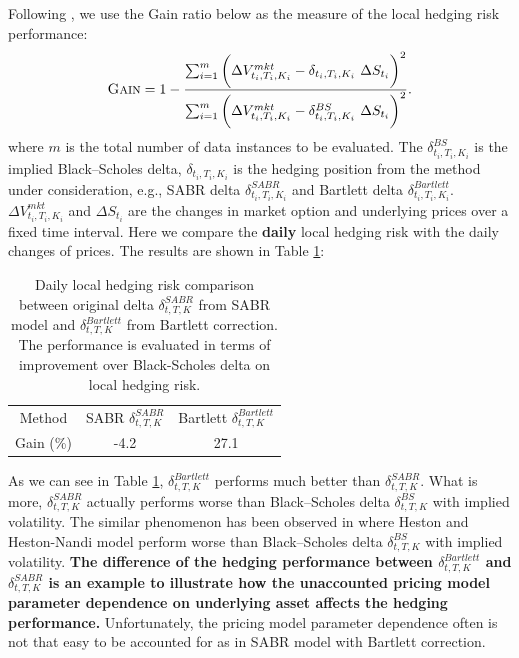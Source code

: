 \documentclass[letterpaper,12pt,titlepage,oneside,final]{book}
\numberwithin{equation}{section}
\theoremstyle{definition}
\begin{document}
\begin{itemize}
    Following \cite{hulloptimal},  we use the Gain ratio below as the measure of the local hedging risk performance:
    \begin{equation}
    \textsc{Gain}=1-\frac{\sum_{i=1}^m \bigg(\Delta V^{mkt}_{t_i,T_i,K_i}-\delta_{t_i,T_i,K_i} ~ \Delta S_{t_i} \bigg)^2}{\sum_{i=1}^m \bigg(\Delta V^{mkt}_{t_i,T_i,K_i}-\delta^{BS}_{t_i,T_i,K_i} ~ \Delta S_{t_i} \bigg)^2}.
    \label{eq:Gain}
    \end{equation}
    where $m$ is the total number of data instances to be evaluated.  The $\delta^{BS}_{t_i,T_i,K_i}$ is the implied Black–Scholes delta, $\delta_{t_i,T_i,K_i}$  is the hedging position from the method under consideration,  e.g., SABR delta $\delta^{SABR}_{t_i,T_i,K_i}$ and  Bartlett delta $\delta^{Bartlett}_{t_i,T_i,K_i}$. $\Delta V^{mkt}_{t_i,T_i,K_i}$ and $\Delta S_{t_i}$
    are the changes in market option and underlying prices over a fixed time interval. Here we compare the \textbf{daily} local hedging risk with the daily changes of prices. The results are shown in Table \ref{table:Bartlett}:
    \begin{table}[htp!]
        \centering
        \begin{tabular}{|c|c|c|}
            \hline
            Method& SABR $\delta^{SABR}_{t,T,K}$ & Bartlett $\delta^{Bartlett}_{t,T,K}$\\
            Gain (\%) &-4.2 & 27.1 \\
            \hline
        \end{tabular}
        \caption{Daily local hedging risk comparison between original delta $\delta^{SABR}_{t,T,K}$ from SABR model and  $\delta^{Bartlett}_{t,T,K}$ from Bartlett correction. The performance is evaluated in terms of improvement over Black-Scholes delta on local hedging risk.}
        \label{table:Bartlett}
    \end{table}
    As we can see in Table \ref{table:Bartlett}, $\delta^{Bartlett}_{t,T,K}$ performs much better than $\delta^{SABR}_{t,T,K}$. What is more, $\delta^{SABR}_{t,T,K}$ actually performs worse than Black–Scholes delta $\delta^{BS}_{t,T,K}$ with implied volatility. The similar phenomenon has been observed in \cite{lassance2018comparison} where Heston and Heston-Nandi model perform worse than Black–Scholes delta $\delta^{BS}_{t,T,K}$ with implied volatility.  \textbf{The difference of the hedging performance between $\delta^{Bartlett}_{t,T,K}$ and $\delta^{SABR}_{t,T,K}$ is an example to illustrate how the unaccounted  pricing model parameter dependence on underlying asset affects the hedging performance. }Unfortunately, the pricing model parameter dependence often is not that easy to be accounted for as in SABR model with Bartlett correction.
\end{itemize}
\end{document}

